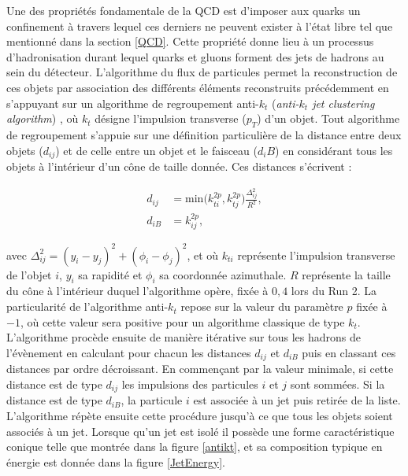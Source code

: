 Une des propriétés fondamentale de la QCD est d'imposer aux quarks un confinement à travers lequel ces derniers ne peuvent exister à l'état libre tel que mentionné dans la section \ref{QCD}. Cette propriété donne lieu à un processus d'hadronisation durant lequel quarks et gluons forment des jets de hadrons au sein du détecteur. L'algorithme du flux de particules permet la reconstruction de ces objets par association des différents éléments reconstruits précédemment en s'appuyant sur un algorithme de regroupement anti-$k_t$ (\textit{anti-$k_t$ jet clustering algorithm}) \cite{antikt}, où $k_t$ désigne l'impulsion transverse ($p_T$) d'un objet. Tout algorithme de regroupement s'appuie sur une définition particulière de la distance entre deux objets ($d_{ij}$) et de celle entre un objet et le faisceau ($d_iB$) en considérant tous les objets à l'intérieur d'un cône de taille donnée. Ces distances s'écrivent :

\begin{align}
    d_{ij} & = \mbox{min}\bigl(k_{ti}^{2p},k_{tj}^{2p}\bigr)\frac{\Delta_{ij}^2}{R^2}, \\
    d_{iB} & = k_{ij}^{2p},
\end{align}

avec $\Delta^2_{ij}=(y_i-y_j)^2+(\phi_i-\phi_j)^2$, et où $k_{ti}$ représente l'impulsion transverse de l'objet $i$, $y_i$ sa rapidité et $\phi_i$ sa coordonnée azimuthale. $R$ représente la taille du cône à l'intérieur duquel l'algorithme opère, fixée à $0,4$ lors du Run 2. La particularité de l'algorithme anti-$k_t$ repose sur la valeur du paramètre $p$ fixée à $-1$, où cette valeur sera positive pour un algorithme classique de type $k_t$. L'algorithme procède ensuite de manière itérative sur tous les hadrons de l'évènement en calculant pour chacun les distances $d_{ij}$ et $d_{iB}$ puis en classant ces distances par ordre décroissant. En commençant par la valeur minimale, si cette distance est de type $d_{ij}$ les impulsions des particules $i$ et $j$ sont sommées. Si la distance est de type $d_{iB}$, la particule $i$ est associée à un jet puis retirée de la liste. L'algorithme répète ensuite cette procédure jusqu'à ce que tous les objets soient associés à un jet. Lorsque qu'un jet est isolé il possède une forme caractéristique conique telle que montrée dans la figure \ref{antikt}, et sa composition typique en énergie est donnée dans la figure \ref{JetEnergy}. \\

